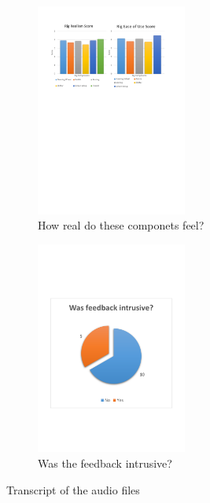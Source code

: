 \begin{figure}[!htb]
	\centering
	\includegraphics[height=7cm]{charts/realistic.pdf}
	\caption{How real do these componets feel?}
\label{fig:chart-realistic}
\end{figure}

\begin{figure}[!htb]
	\centering
	\includegraphics[height=7cm]{charts/intrusivefeedback.pdf}
	\caption{Was the feedback intrusive?}
\label{fig:chart-intrusivefeedback}
\end{figure}

Transcript of the audio files
